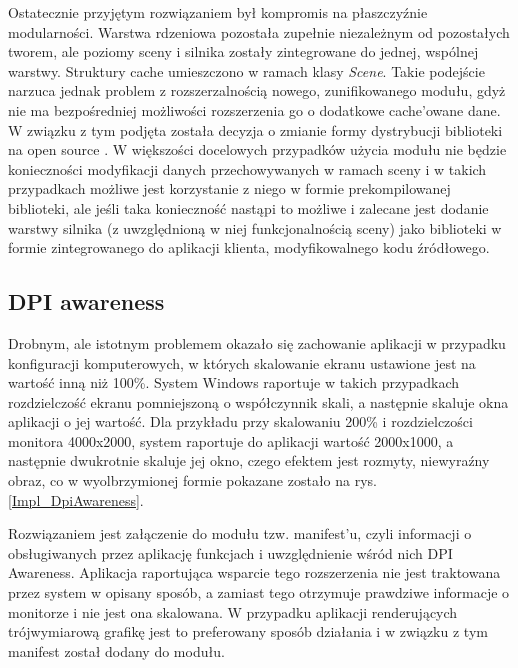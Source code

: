 Ostatecznie przyjętym rozwiązaniem był kompromis na płaszczyźnie modularności. Warstwa rdzeniowa pozostała zupełnie niezależnym od pozostałych tworem, ale poziomy sceny i silnika zostały zintegrowane do jednej, wspólnej warstwy. Struktury cache umieszczono w ramach klasy \textit{Scene}. Takie podejście narzuca jednak problem z rozszerzalnością nowego, zunifikowanego modułu, gdyż nie ma bezpośredniej możliwości rozszerzenia go o dodatkowe cache'owane dane. W związku z tym podjęta została decyzja o zmianie formy dystrybucji biblioteki na open source \cite{GitHub:Minik:MasterThesisUniversalRenderingModuleD3D11}. W większości docelowych przypadków użycia modułu nie będzie konieczności modyfikacji danych przechowywanych w ramach sceny i w takich przypadkach możliwe jest korzystanie z niego w formie prekompilowanej biblioteki, ale jeśli taka konieczność nastąpi to możliwe i zalecane jest dodanie warstwy silnika (z uwzględnioną w niej funkcjonalnością sceny) jako biblioteki w formie zintegrowanego do aplikacji klienta, modyfikowalnego kodu źródłowego. 

\subsection{DPI awareness}
Drobnym, ale istotnym problemem okazało się zachowanie aplikacji w przypadku konfiguracji komputerowych, w których skalowanie ekranu ustawione jest na wartość inną niż 100\%. System Windows raportuje w takich przypadkach rozdzielczość ekranu pomniejszoną o współczynnik skali, a następnie skaluje okna aplikacji o jej wartość. Dla przykładu przy skalowaniu 200\% i rozdzielczości monitora 4000x2000, system raportuje do aplikacji wartość 2000x1000, a następnie dwukrotnie skaluje jej okno, czego efektem jest rozmyty, niewyraźny obraz, co w wyolbrzymionej formie pokazane zostało na rys. \ref{Impl_DpiAwareness}.

Rozwiązaniem jest załączenie do modułu tzw. manifest'u, czyli informacji o obsługiwanych przez aplikację funkcjach i uwzględnienie wśród nich DPI Awareness. Aplikacja raportująca wsparcie tego rozszerzenia nie jest traktowana przez system w opisany sposób, a zamiast tego otrzymuje prawdziwe informacje o monitorze i nie jest ona skalowana. W przypadku aplikacji renderujących trójwymiarową grafikę jest to preferowany sposób działania i w związku z tym manifest został dodany do modułu. 

